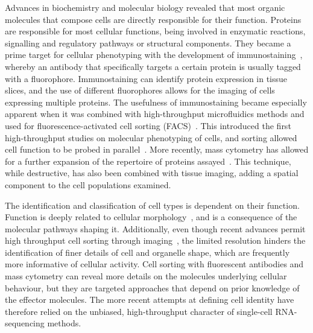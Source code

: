Advances in biochemistry and molecular biology revealed that most organic molecules that compose cells are directly responsible for their function. Proteins are responsible for most cellular functions, being involved in enzymatic reactions, signalling and regulatory pathways or structural components. They became a prime target for cellular phenotyping with the development of immunostaining~\citep{coons_immunological_1941}, whereby an antibody that specifically targets a certain protein is usually tagged with a fluorophore. Immunostaining can identify protein expression in tissue slices, and the use of different fluorophores allows for the imaging of cells expressing multiple proteins. The usefulness of immunostaining became especially apparent when it was combined with high-throughput microfluidics methods and used for fluorescence-activated cell sorting (FACS)~\citep{bonner_fluorescence_1972}. This introduced the first high-throughput studies on molecular phenotyping of cells, and sorting allowed cell function to be probed in parallel~\citep{julius_demonstration_1972}. More recently, mass cytometry has allowed for a further expansion of the repertoire of proteins assayed~\citep{bandura_mass_2009,di_palma_unraveling_2015}. This technique, while destructive, has also been combined with tissue imaging, adding a spatial component to the cell populations examined.

The identification and classification of cell types is dependent on their function. Function is deeply related to cellular morphology~\citep{prasad_cell_2019}, and is a consequence of the molecular pathways shaping it. Additionally, even though recent advances permit high throughput cell sorting through imaging~\citep{nitta_intelligent_2018}, the limited resolution hinders the identification of finer details of cell and organelle shape, which are frequently more informative of cellular activity. Cell sorting with fluorescent antibodies and mass cytometry can reveal more details on the molecules underlying cellular behaviour, but they are targeted approaches that depend on prior knowledge of the effector molecules. The more recent attempts at defining cell identity have therefore relied on the unbiased, high-throughput character of single-cell RNA-sequencing methods.



